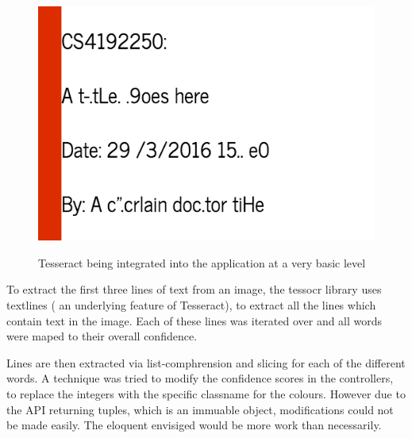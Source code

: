 \begin{figure}[H]
  \centering
  \includegraphics{images/tesseract_first}
  \label{fig:tesseract_output}
  \caption{Tesseract being integrated into the application at a very basic level}
\end{figure}

To extract the first three lines of text from an image, the tessocr library uses textlines ( an underlying feature of Tesseract), to extract all the lines which contain text in the image. Each of these lines was iterated over and all words were maped to their overall confidence.

Lines are then extracted via list-comphrension and slicing for each of the different words. A technique was tried to modify the confidence scores in the controllers, to replace the integers with the specific classname for the colours. However due to the API returning tuples, which is an immuable object, modifications could not be made easily. The eloquent envisiged would be more work than necessarily.

